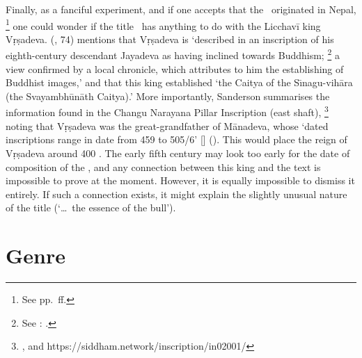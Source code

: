 Finally, as a fanciful experiment, and if one accepts 
that the \VSS\ originated in Nepal,%
		\footnote{See pp.~\pageref{provenance}ff.}
one could wonder if the title \Vss\ 
has anything to do with the Licchavī king Vṛṣadeva.
\citeauthor{SandersonSaivaAge} 
(\citeyear{SandersonSaivaAge}, 74) mentions that  
Vṛṣadeva is `described in an inscription of his eighth-century 
descendant Jayadeva as having inclined towards Buddhism;%
			 \footnote{See : 
					.}
a view conﬁrmed by a local chronicle, which attributes to
him the establishing of Buddhist images,'
and that this king established 
`the Caitya of the Sı̄nagu-vihāra (the Svayambhūnāth Caitya).'
More importantly, Sanderson summarises the 
information found in the Changu Narayana Pillar Inscription (east shaft),%
		\footnote{\mycitep{GnoliNepInscr}{1},  and 
		https://siddham.network/inscription/in02001/} 
noting that Vṛṣadeva was the great-grandfather of Mānadeva, whose
`dated inscriptions range in date from 459 to 505/6' [\CE]
().
This would place 
the reign of Vṛṣadeva around 400 \CE. 
The early fifth century may look too early for the date of composition
of the \VSS, and any connection between this king
and the text is impossible to prove at the moment.
However, it is equally impossible to dismiss it entirely.
If such a connection exists, 
it might explain the slightly unusual nature of the title (`\dots\ the essence of the bull').
\hide{
}

%
%







\section{Genre}

